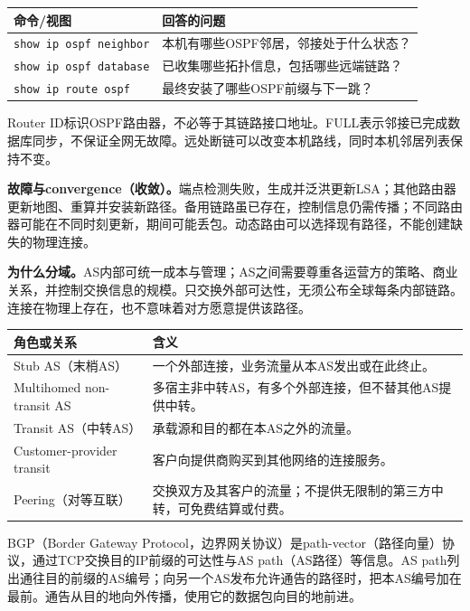 \begin{center}
\small
\begin{tabularx}{\textwidth}{@{}lX@{}}
\toprule
命令/视图 & 回答的问题 \\
\midrule
\texttt{show ip ospf neighbor} & 本机有哪些OSPF邻居，邻接处于什么状态？\\
\texttt{show ip ospf database} & 已收集哪些拓扑信息，包括哪些远端链路？\\
\texttt{show ip route ospf} & 最终安装了哪些OSPF前缀与下一跳？\\
\bottomrule
\end{tabularx}
\end{center}

Router ID标识OSPF路由器，不必等于其链路接口地址。FULL表示邻接已完成数据库同步，不保证全网无故障。远处断链可以改变本机路线，同时本机邻居列表保持不变。

\textbf{故障与convergence（收敛）。}端点检测失败，生成并泛洪更新LSA；其他路由器更新地图、重算并安装新路径。备用链路虽已存在，控制信息仍需传播；不同路由器可能在不同时刻更新，期间可能丢包。动态路由可以选择现有路径，不能创建缺失的物理连接。


\textbf{为什么分域。}AS内部可统一成本与管理；AS之间需要尊重各运营方的策略、商业关系，并控制交换信息的规模。只交换外部可达性，无须公布全球每条内部链路。连接在物理上存在，也不意味着对方愿意提供该路径。

\begin{center}
\small
\begin{tabularx}{\textwidth}{@{}lX@{}}
\toprule
角色或关系 & 含义 \\
\midrule
Stub AS（末梢AS） & 一个外部连接，业务流量从本AS发出或在此终止。\\
Multihomed non-transit AS & 多宿主非中转AS，有多个外部连接，但不替其他AS提供中转。\\
Transit AS（中转AS） & 承载源和目的都在本AS之外的流量。\\
Customer-provider transit & 客户向提供商购买到其他网络的连接服务。\\
Peering（对等互联） & 交换双方及其客户的流量；不提供无限制的第三方中转，可免费结算或付费。\\
\bottomrule
\end{tabularx}
\end{center}

BGP（Border Gateway Protocol，边界网关协议）是path-vector（路径向量）协议，通过TCP交换目的IP前缀的可达性与AS path（AS路径）等信息。AS path列出通往目的前缀的AS编号；向另一个AS发布允许通告的路径时，把本AS编号加在最前。通告从目的地向外传播，使用它的数据包向目的地前进。

